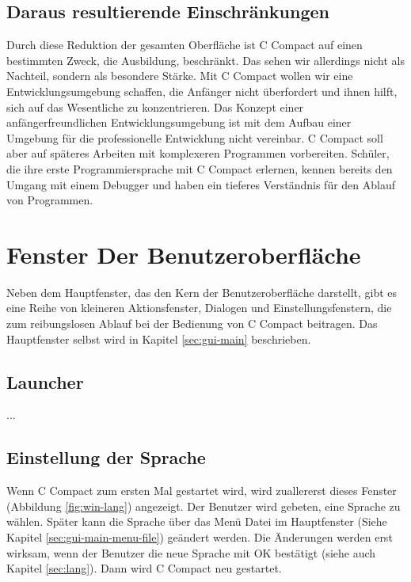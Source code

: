 \subsection{Daraus resultierende Einschränkungen}
Durch diese Reduktion der gesamten Oberfläche ist C Compact auf einen bestimmten Zweck, die Ausbildung, beschränkt. Das sehen wir allerdings nicht als Nachteil, sondern als besondere Stärke. Mit C Compact wollen wir eine Entwicklungsumgebung schaffen, die Anfänger nicht überfordert und ihnen hilft, sich auf das Wesentliche zu konzentrieren.
Das Konzept einer anfängerfreundlichen Entwicklungsumgebung ist mit dem Aufbau einer Umgebung für die professionelle Entwicklung nicht vereinbar. C Compact soll aber auf späteres Arbeiten mit komplexeren Programmen vorbereiten. Schüler, die ihre erste Programmiersprache mit C Compact erlernen, kennen bereits den Umgang mit einem Debugger und haben ein tieferes Verständnis für den Ablauf von Programmen.

\section{Fenster Der Benutzeroberfläche}
Neben dem Hauptfenster, das den Kern der Benutzeroberfläche darstellt, gibt es eine Reihe von kleineren Aktionsfenster, Dialogen und Einstellungsfenstern, die zum reibungslosen Ablauf bei der Bedienung von C Compact beitragen. Das Hauptfenster selbst wird in Kapitel \ref{sec:gui-main} beschrieben.

\subsection{Launcher}
\label{sec:win-launcher}
...

\subsection{Einstellung der Sprache}
\label{sec:win-lang}
Wenn C Compact zum ersten Mal gestartet wird, wird zuallererst dieses Fenster (Abbildung \ref{fig:win-lang}) angezeigt. Der Benutzer wird gebeten, eine Sprache zu wählen. Später kann die Sprache über das Menü \glqq{}Datei\grqq{} im Hauptfenster (Siehe Kapitel \ref{sec:gui-main-menu-file}) geändert werden. Die Änderungen werden erst wirksam, wenn der Benutzer die neue Sprache mit \glqq{}OK\grqq{} bestätigt (siehe auch Kapitel \ref{sec:lang}). Dann wird C Compact neu gestartet.

